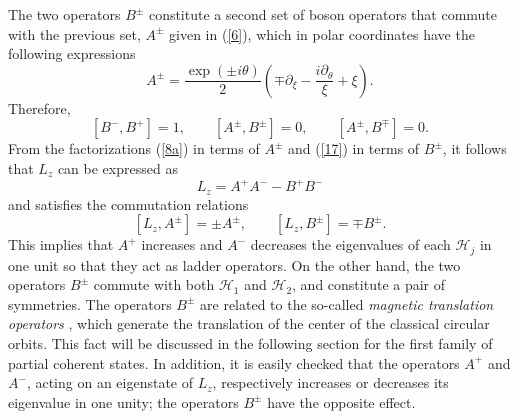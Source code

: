 \documentclass[aps,showpacs,showkeys]{revtex4}
\begin{document}
The two operators $B^{\pm}$ constitute a second set of boson operators that commute with the previous set, $A^{\pm}$ given in (\ref{6}), which in polar coordinates have the following expressions
	\begin{equation}\label{35}
A^\pm=\frac{\exp(\pm i\theta)}{2}\left(\mp\partial_\xi-\frac{i\partial_\theta}{\xi}+\xi\right).
\end{equation}
Therefore,
\begin{equation}\label{16}
[B^-,B^+]=1, \qquad [A^\pm,B^\pm]=0, \qquad [A^\pm,B^\mp]=0.
\end{equation}
From the factorizations (\ref{8a}) in terms of $A^{\pm}$ and (\ref{17}) in terms of $B^{\pm}$, it follows that $L_z$ can be expressed as
\begin{equation}\label{19}
	L_z=A^+A^--B^+B^-
\end{equation}
and satisfies the commutation relations
\begin{equation}\label{20}
	[L_z,A^\pm]=\pm A^\pm, \qquad [L_z,B^\pm]=\mp B^\pm.
\end{equation}
This implies that $A^{+}$ increases and $A^{-}$ decreases the eigenvalues of each $\mathcal{H}_{j}$ in one unit so that they act as ladder operators. On the other hand, the two operators $B^\pm$ commute with both $\mathcal{H}_1$ and $\mathcal{H}_2$, and constitute a pair of symmetries. The operators $B^\pm$ are related to the so-called {\it magnetic translation operators} \cite{z64,b64,l83}, which  generate the translation of the center of the classical circular orbits. This fact will be discussed in the following section for the first family of partial coherent states.
In addition, it is easily checked that the operators $A^+$ and $A^-$, acting on an eigenstate of $L_z$, 
respectively increases or decreases its eigenvalue in one unity; the operators $B^\pm$ have the opposite effect.
\end{document}
